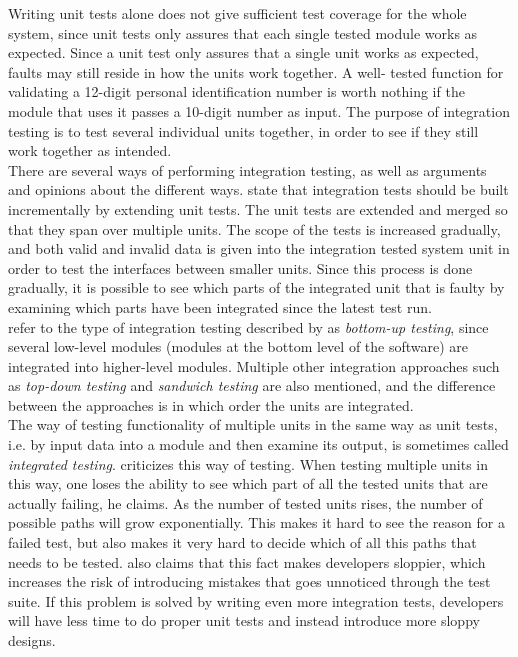 Writing unit tests alone does not give sufficient test coverage for the
whole system, since unit tests only assures that each single tested
module works as expected. Since a unit test only assures that a single
unit works as expected, faults may still reside in how the units work
together. A well- tested function for validating a 12-digit personal
identification number is worth nothing if the module that uses it passes
a 10-digit number as input. The purpose of integration testing is to
test several individual units together, in order to see if they still
work together as intended.\\

There are several ways of performing integration testing, as well as
arguments and opinions about the different ways. \citet{book:adp} state
that integration tests should be built incrementally by extending unit
tests. The unit tests are extended and merged so that they span over
multiple units. The scope of the tests is increased gradually, and both
valid and invalid data is given into the integration tested system unit
in order to test the interfaces between smaller units. Since this
process is done gradually, it is possible to see which parts of the
integrated unit that is faulty by examining which parts have been
integrated since the latest test run.\\

\citet{book:pfleeger} refer to the type of integration testing described
by \citeauthor{book:adp} as \emph{bottom-up testing}, since several
low-level modules (modules at the bottom level of the software) are
integrated into higher-level modules. Multiple other integration
approaches such as \emph{top-down testing} and \emph{sandwich testing}
are also mentioned, and the difference between the approaches is in which
order the units are integrated.\\

The way of testing functionality of multiple units in the same way as
unit tests, i.e. by input data into a module and then examine its
output, is sometimes called \emph{integrated testing}.
\citet{video:integrated_scam} criticizes this way of testing. When
testing multiple units in this way, one loses the ability to see which
part of all the tested units that are actually failing, he claims. As
the number of tested units rises, the number of possible paths will grow
exponentially. This makes it hard to see the reason for a failed test,
but also makes it very hard to decide which of all this paths that needs
to be tested. \citeauthor{video:integrated_scam} also claims that this
fact makes developers sloppier, which increases the risk of introducing
mistakes that goes unnoticed through the test suite. If this problem is
solved by writing even more integration tests, developers will have less
time to do proper unit tests and instead introduce more sloppy
designs.\\

